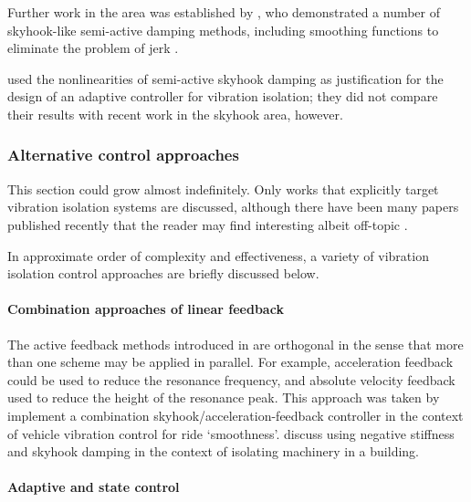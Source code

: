 Further work in the area was established by \textcite{liu2002}, who demonstrated a number of skyhook-like semi-active damping methods, including smoothing functions to eliminate the problem of jerk
\cite{liu2005}.

\textcite{song2007} used the nonlinearities of semi-active skyhook damping as justification for the design of an adaptive controller for vibration isolation; they did not compare their results with recent work in the skyhook area, however.


\subsubsection{Alternative control approaches}

This section could grow almost indefinitely. Only works that explicitly target vibration isolation systems are discussed, although there have been many papers published recently that the reader may find interesting albeit off-topic \cite{chatterjee2008,mottershead2008}.

In approximate order of complexity and effectiveness, a variety of vibration isolation control approaches are briefly discussed below.

\paragraph{Combination approaches of linear feedback}

The active feedback methods introduced in  are orthogonal in the sense that more than one scheme may be applied in parallel.
For example, acceleration feedback could be used to reduce the resonance frequency, and absolute velocity feedback used to reduce the height of the resonance peak.
This approach was taken by \textcite{savaresi2007} implement a combination skyhook/acceleration-feedback controller in the context of vehicle vibration control for ride `smoothness'.
\textcite{gavin2007} discuss using negative stiffness and skyhook damping in the context of isolating machinery in a building.


\paragraph{Adaptive and state control}

